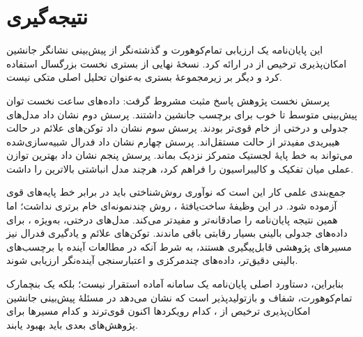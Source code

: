 \chapter{نتیجه‌گیری}
\label{ch:conclusion}

این پایان‌نامه یک ارزیابی تمام‌کوهورت و گذشته‌نگر از پیش‌بینی نشانگر جانشین امکان‌پذیری ترخیص از  در  ارائه کرد. نسخۀ نهایی از  بستری نخست بزرگسال استفاده کرد و دیگر بر زیرمجموعۀ  بستری به‌عنوان تحلیل اصلی متکی نیست.

پرسش نخست پژوهش پاسخ مثبت مشروط گرفت: داده‌های  ساعت نخست  توان پیش‌بینی متوسط تا خوب برای برچسب جانشین داشتند. پرسش دوم نشان داد مدل‌های جدولی و درختی از  خام قوی‌تر بودند. پرسش سوم نشان داد توکن‌های علائم در حالت هیبریدی مفیدتر از حالت مستقل‌اند. پرسش چهارم نشان داد فدرال شبیه‌سازی‌شده می‌تواند به خط پایۀ لجستیک متمرکز نزدیک بماند. پرسش پنجم نشان داد  بهترین توازن عملی میان تفکیک و کالیبراسیون را فراهم کرد، هرچند مدل انباشتی بالاترین  را داشت.

جمع‌بندی علمی کار این است که نوآوری روش‌شناختی باید در برابر خط پایه‌های قوی آزموده شود. در این وظیفۀ ساخت‌یافتۀ ، روش چندنمونه‌ای خام برتری نداشت؛ اما همین نتیجه پایان‌نامه را صادقانه‌تر و مفیدتر می‌کند. مدل‌های درختی، به‌ویژه ، برای داده‌های جدولی بالینی بسیار رقابتی باقی ماندند. توکن‌های علائم و یادگیری فدرال نیز مسیرهای پژوهشی قابل‌پیگیری هستند، به شرط آنکه در مطالعات آینده با برچسب‌های بالینی دقیق‌تر، داده‌های چندمرکزی و اعتبارسنجی آینده‌نگر ارزیابی شوند.

بنابراین، دستاورد اصلی پایان‌نامه یک سامانه آماده استقرار نیست؛ بلکه یک بنچمارک تمام‌کوهورت، شفاف و بازتولیدپذیر است که نشان می‌دهد در مسئلۀ پیش‌بینی جانشین امکان‌پذیری ترخیص از ، کدام رویکردها اکنون قوی‌ترند و کدام مسیرها برای پژوهش‌های بعدی باید بهبود یابند.
